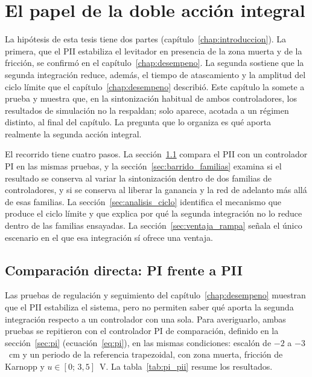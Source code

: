 \chapter{El papel de la doble acción integral}\label{chap:doble_integral}

La hipótesis de esta tesis tiene dos partes (capítulo~\ref{chap:introduccion}). La primera, que el PII estabiliza el levitador en presencia de la zona muerta y de la fricción, se confirmó en el capítulo~\ref{chap:desempeno}. La segunda sostiene que la segunda integración reduce, además, el tiempo de atascamiento y la amplitud del ciclo límite que el capítulo~\ref{chap:desempeno} describió. Este capítulo la somete a prueba y muestra que, en la sintonización habitual de ambos controladores, los resultados de simulación no la respaldan; solo aparece, acotada a un régimen distinto, al final del capítulo. La pregunta que lo organiza es qué aporta realmente la segunda acción integral.

El recorrido tiene cuatro pasos. La sección~\ref{sec:pi_pii} compara el PII con un controlador PI en las mismas pruebas, y la sección~\ref{sec:barrido_familias} examina si el resultado se conserva al variar la sintonización dentro de dos familias de controladores, y si se conserva al liberar la ganancia y la red de adelanto más allá de esas familias. La sección~\ref{sec:analisis_ciclo} identifica el mecanismo que produce el ciclo límite y que explica por qué la segunda integración no lo reduce dentro de las familias ensayadas. La sección~\ref{sec:ventaja_rampa} señala el único escenario en el que esa integración sí ofrece una ventaja.

\section{Comparación directa: PI frente a PII}\label{sec:pi_pii}

Las pruebas de regulación y seguimiento del capítulo~\ref{chap:desempeno} muestran que el PII estabiliza el sistema, pero no permiten saber qué aporta la segunda integración respecto a un controlador con una sola. Para averiguarlo, ambas pruebas se repitieron con el controlador PI de comparación, definido en la sección~\ref{sec:pi} (ecuación~\eqref{eq:pi}), en las mismas condiciones: escalón de $-2$ a $-3$~cm y un periodo de la referencia trapezoidal, con zona muerta, fricción de Karnopp y $u\in[0;\,3{,}5]$~V. La tabla~\ref{tab:pi_pii} resume los resultados.

